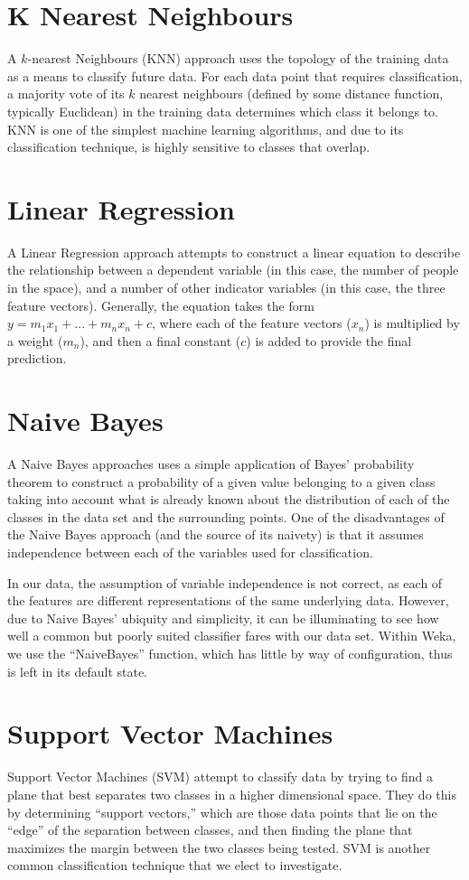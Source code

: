 \section{K Nearest Neighbours}
A $k$-nearest Neighbours (KNN) approach uses the topology of the training data as a means to classify future data. For each data point that requires classification, a majority vote of its $k$ nearest neighbours (defined by some distance function, typically Euclidean) in the training data determines which class it belongs to. KNN is one of the simplest machine learning algorithms, and due to its classification technique, is highly sensitive to classes that overlap. 

\section{Linear Regression}
A Linear Regression approach attempts to construct a linear equation to describe the relationship between a dependent variable (in this case, the number of people in the space), and a number of other indicator variables (in this case, the three feature vectors). Generally, the equation takes the form $y = m_1x_1 + ... + m_nx_n + c$, where each of the feature vectors ($x_n$) is multiplied by a weight ($m_n$), and then a final constant ($c$) is added to provide the final prediction.

\section{Naive Bayes}
A Naive Bayes approaches uses a simple application of Bayes' probability theorem to construct a probability of a given value belonging to a given class taking into account what is already known about the distribution of each of the classes in the data set and the surrounding points. One of the disadvantages of the Naive Bayes approach (and the source of its naivety) is that it assumes independence between each of the variables used for classification.

In our data, the assumption of variable independence is not correct, as each of the features are different representations of the same underlying data. However, due to Naive Bayes' ubiquity and simplicity, it can be illuminating to see how well a common but poorly suited classifier fares with our data set. Within Weka, we use the ``NaiveBayes'' function, which has little by way of configuration, thus is left in its default state.

\section{Support Vector Machines}
Support Vector Machines (SVM) attempt to classify data by trying to find a plane that best separates two classes in a higher dimensional space. They do this by determining ``support vectors,'' which are those data points that lie on the ``edge'' of the separation between classes, and then finding the plane that maximizes the margin between the two classes being tested. SVM is another common classification technique that we elect to investigate.

